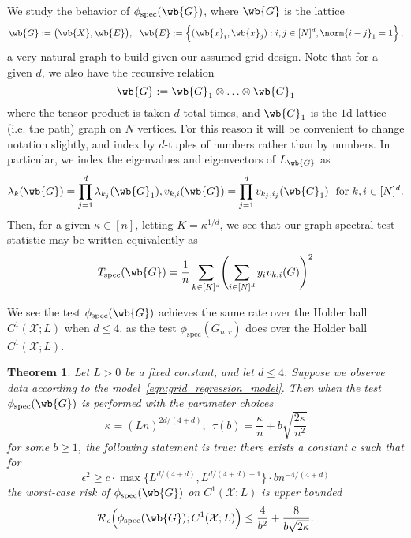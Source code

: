 \documentclass{article}
\newcommand{\set}[1]{\left\{#1\right\}}
\newcommand{\1}{\mathbf{1}}
\newcommand{\Xset}{\mathcal{X}}
\newcommand{\spec}{\mathrm{spec}}
\theoremstyle{alden}
\theoremstyle{aldenthm}
\newtheorem{theorem}{Theorem}
\theoremstyle{definition}
\theoremstyle{remark}
\begin{document}
We study the behavior of $\phi_{\spec}(\wb{G})$, where $\wb{G}$ is the lattice
\begin{equation*}
\wb{G} := \bigl(\wb{X},\wb{E}\bigr),~~ \wb{E} := \set{(\wb{x}_i,\wb{x}_j): i,j \in [N]^d, \norm{i - j}_1 = 1},
\end{equation*}
a very natural graph to build given our assumed grid design. Note that for a given $d$, we also have the recursive relation
\begin{equation*}
\wb{G} := \wb{G}_1 \otimes \ldots \otimes \wb{G}_1
\end{equation*}
where the tensor product is taken $d$ total times, and $\wb{G}_1$ is the $1$d lattice (i.e. the path) graph on $N$ vertices. For this reason it will be convenient to change notation slightly, and index by $d$-tuples of numbers rather than by numbers. In particular, we index the eigenvalues and eigenvectors of $L_{\wb{G}}$ as
\begin{equation*}
\lambda_k(\wb{G}) = \prod_{j = 1}^{d} \lambda_{k_j}(\wb{G}_1), v_{k,i}(\wb{G}) = \prod_{j = 1}^{d} v_{k_j,i_j}(\wb{G}_1)~~\textrm{for $k,i \in [N]^d$.}
\end{equation*}
Then, for a given $\kappa \in [n]$, letting $K = \kappa^{1/d}$, we see that our graph spectral test statistic may be written equivalently as
\begin{equation*}
T_{\spec}(\wb{G}) = \frac{1}{n} \sum_{k \in [K]^d} \Biggl(\sum_{i \in [N]^d} y_i v_{k,i}(G)\Biggr)^2
\end{equation*}

We see the test $\phi_{\spec}(\wb{G})$ achieves the same rate over the Holder ball $C^{1}(\Xset;L)$ when $d \leq 4$, as the test $\phi_{\spec}(G_{n,r})$ does over the Holder ball $C^1(\Xset;L)$.
\begin{theorem}
	\label{thm:holder_testing_rate_grid}
	Let $L > 0$ be a fixed constant, and let $d \leq 4$. Suppose we observe data according to the model~\eqref{eqn:grid_regression_model}. Then when the test $\phi_{\spec}(\wb{G})$ is performed with the parameter choices
	\begin{equation*}
	\kappa = (Ln)^{2d/(4 + d)},~~ \tau(b) = \frac{\kappa}{n} + b\sqrt{\frac{2\kappa}{n^2}}
	\end{equation*}
	for some $b \geq 1$, the following statement is true: there exists a constant $c$ such that for 
	\begin{equation}
	\label{eqn:holder_testing_rate_grid_1}
	\epsilon^2 \geq c \cdot \max\{L^{d/(4+d)}, L^{d/(4 + d) + 1}\} \cdot b n^{-4/(4 + d)}
	\end{equation}
	the worst-case risk of $\phi_{\spec}(\wb{G})$ on $C^{1}(\Xset;L)$ is upper bounded
	\begin{equation}
	\label{eqn:holder_testing_rate_grid_2}
	\mathcal{R}_{\epsilon}\Bigl(\phi_{\spec}(\wb{G});C^{1}(\Xset;L)\Bigr) \leq \frac{4}{b^2} + \frac{8}{b\sqrt{2\kappa}}.
	\end{equation}
\end{theorem}
\end{document}
